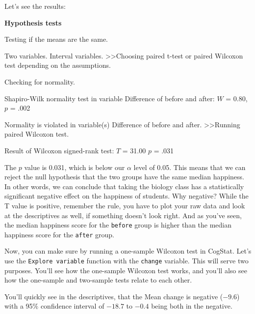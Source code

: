 \documentclass[
  11pt,
  a4paper,
  twoside,symmetric,openright]{book}
\theoremstyle{break}
\theoremstyle{break}
\begin{document}
Let's see the results:

\begin{tcolorbox}[colback=white,
  colframe=lightgray,
  coltext=black,
  boxsep=4pt,
  boxrule=0.3pt,
  arc=0pt]
  {   \sffamily
      \color{CSblue}\textbf{Hypothesis tests}
      
      \color{CSgreen}Testing if the means are the same.
      
      Two variables. Interval variables. \textgreater\textgreater  Choosing paired t-test or paired Wilcoxon test depending on the assumptions.

      Checking for normality.

      \color{black}
      Shapiro-Wilk normality test in variable Difference of before and after: $W$ = 0.80, $p$ = .002

      \color{CSgreen}
      Normality is violated in variable(s) Difference of before and after. \textgreater\textgreater Running paired Wilcoxon test.

      \color{black}
      Result of Wilcoxon signed-rank test: $T$ = 31.00 $p$ = .031
      \normalfont
  }
\end{tcolorbox}

The \(p\) value is 0.031, which is below our \(\alpha\) level of 0.05. This means that we can reject the null hypothesis that the two groups have the same median happiness. In other words, we can conclude that taking the biology class has a statistically significant negative effect on the happiness of students. Why negative? While the T value is positive, remember the rule, you have to plot your raw data and look at the descriptives as well, if something doesn't look right. And as you've seen, the median happiness score for the \texttt{before} group is higher than the median happiness score for the \texttt{after} group.

Now, you can make sure by running a one-sample Wilcoxon test in CogStat. Let's use the \texttt{Explore\ variable} function with the \texttt{change} variable. This will serve two purposes. You'll see how the one-sample Wilcoxon test works, and you'll also see how the one-sample and two-sample tests relate to each other.

You'll quickly see in the descriptives, that the Mean change is negative (\(-9.6\)) with a 95\% confidence interval of \(-18.7\) to \(-0.4\) being both in the negative.
\end{document}
